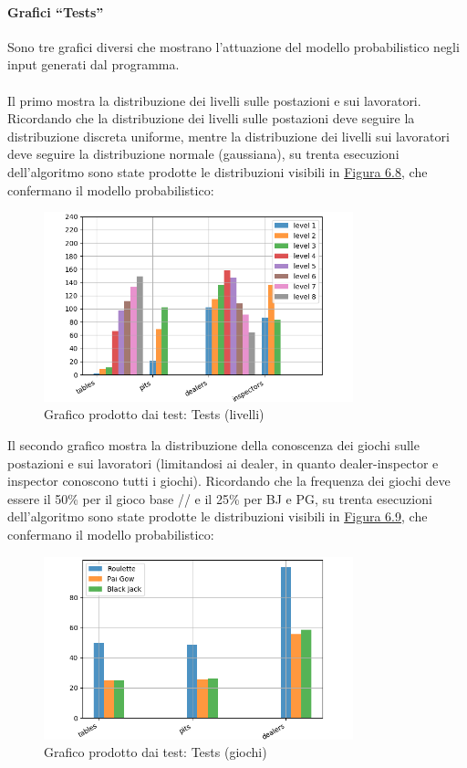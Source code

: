     \paragraph{Grafici ``Tests''} Sono tre grafici diversi che mostrano l'attuazione del modello probabilistico negli input generati dal programma. \\
    \\ Il primo mostra la distribuzione dei livelli sulle postazioni e sui lavoratori. Ricordando che la distribuzione dei livelli sulle postazioni deve seguire la distribuzione discreta uniforme, mentre la distribuzione dei livelli sui lavoratori deve seguire la distribuzione normale (gaussiana), su trenta esecuzioni dell’algoritmo sono state prodotte le distribuzioni visibili in \hyperref[fig68]{Figura 6.8}, che confermano il modello probabilistico:
    \begin{figure}[!h]
        \label{fig68}
            \centering
            \includegraphics[width=0.8\textwidth,keepaspectratio]{../immagini/tests_levels.png}
            \caption{Grafico prodotto dai test: Tests (livelli)}
    \end{figure}
    \FloatBarrier
    \noindent
    Il secondo grafico mostra la distribuzione della conoscenza dei giochi sulle postazioni e sui lavoratori (limitandosi ai dealer, in quanto dealer-inspector e inspector conoscono tutti i giochi). Ricordando che la frequenza dei giochi deve essere il 50\% per il gioco base // e il 25\% per BJ e PG, su trenta esecuzioni dell’algoritmo sono state prodotte le distribuzioni visibili in \hyperref[fig69]{Figura 6.9}, che confermano il modello probabilistico:
    \begin{figure}[!h]
        \label{fig69}
            \centering
            \includegraphics[width=0.8\textwidth,keepaspectratio]{../immagini/tests_games.png}
            \caption{Grafico prodotto dai test: Tests (giochi)}
    \end{figure}
